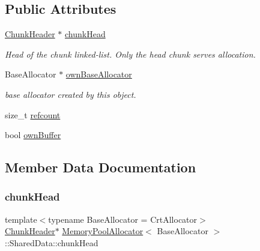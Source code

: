 \subsection*{Public Attributes}
\begin{DoxyCompactItemize}
\item 
\hyperlink{structMemoryPoolAllocator_1_1ChunkHeader}{Chunk\+Header} $\ast$ \hyperlink{structMemoryPoolAllocator_1_1SharedData_a1f6aa37c67bc020bd9e5490a8c5bdfb9}{chunk\+Head}
\begin{DoxyCompactList}\small\item\em Head of the chunk linked-\/list. Only the head chunk serves allocation. \end{DoxyCompactList}\item 
Base\+Allocator $\ast$ \hyperlink{structMemoryPoolAllocator_1_1SharedData_a8e991b807bbdde89645a19bde7398bf7}{own\+Base\+Allocator}
\begin{DoxyCompactList}\small\item\em base allocator created by this object. \end{DoxyCompactList}\item 
size\+\_\+t \hyperlink{structMemoryPoolAllocator_1_1SharedData_a518c933b79807f4fd3518ce6d426f2dc}{refcount}
\item 
bool \hyperlink{structMemoryPoolAllocator_1_1SharedData_a89636640af96ac5eddb73c7377981eb9}{own\+Buffer}
\end{DoxyCompactItemize}


\subsection{Member Data Documentation}
\mbox{\label{structMemoryPoolAllocator_1_1SharedData_a1f6aa37c67bc020bd9e5490a8c5bdfb9}} 
\subsubsection{\texorpdfstring{chunk\+Head}{chunkHead}}
{\footnotesize\ttfamily template$<$typename Base\+Allocator = Crt\+Allocator$>$ \\
\hyperlink{structMemoryPoolAllocator_1_1ChunkHeader}{Chunk\+Header}$\ast$ \hyperlink{classMemoryPoolAllocator}{Memory\+Pool\+Allocator}$<$ Base\+Allocator $>$\+::Shared\+Data\+::chunk\+Head}



